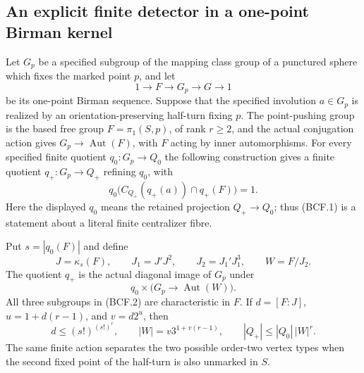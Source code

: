 \subsection{An explicit finite detector in a one-point Birman kernel}

\begin{proposition}\label{prop:birman-cyclic-fibre-detector}
Let $G_p$ be a specified subgroup of the mapping class group of
a punctured sphere which fixes the marked point $p$, and let
\[
 1\longrightarrow F\longrightarrow G_p\longrightarrow G
       \longrightarrow1
\]
be its one-point Birman sequence.  Suppose that the specified
involution $a\in G_p$ is realized by an orientation-preserving
half-turn fixing $p$.  The point-pushing group is the based
free group $F=\pi_1(S,p)$, of rank $r\geq2$, and the actual
conjugation action gives $G_p\to\operatorname{Aut}(F)$,
with $F$ acting by inner automorphisms.
For every specified finite quotient $q_0:G_p\to Q_0$ the
following construction gives a finite quotient $q_+:G_p\to Q_+$
refining $q_0$, with
\[
 q_0\bigl(C_{Q_+}(q_+(a))\cap q_+(F)\bigr)=1.          \tag{BCF.1}
\]
Here the displayed $q_0$ means the retained projection
$Q_+\to Q_0$; thus (BCF.1) is a statement about a literal
finite centralizer fibre.

Put $s=|q_0(F)|$ and define
\[
 J=\kappa_s(F),\qquad J_1=J'J^2,\qquad
 J_2=J_1'J_1^3,\qquad W=F/J_2.                         \tag{BCF.2}
\]
The quotient $q_+$ is the actual diagonal image of $G_p$ under
\[
             q_0\times\bigl(G_p\longrightarrow
                                      \operatorname{Aut}(W)\bigr).
                                                               \tag{BCF.3}
\]
All three subgroups in (BCF.2) are characteristic in $F$.
If $d=[F:J]$, $u=1+d(r-1)$, and $v=d2^u$, then
\[
 d\leq(s!)^{(s!)^r},\qquad
 |W|=v3^{1+v(r-1)},\qquad |Q_+|\leq|Q_0|\,|W|^r.     \tag{BCF.4}
\]
The same finite action separates the two possible order-two
vertex types when the second fixed point of the half-turn is
also unmarked in $S$.
\end{proposition}

